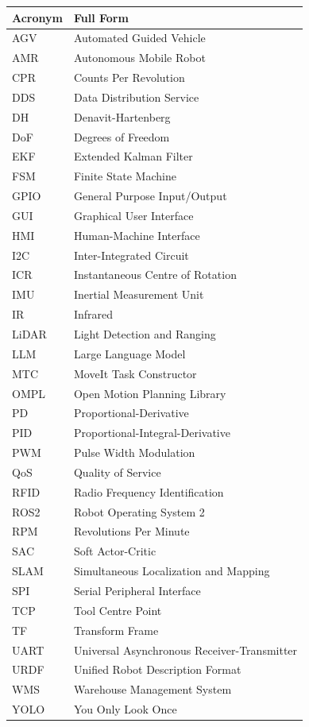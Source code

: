 \documentclass[12pt,a4paper,oneside]{report}
\begin{document}
\begin{longtable}{p{3cm} p{10cm}}
\toprule
\textbf{Acronym} & \textbf{Full Form} \\
\midrule
AGV & Automated Guided Vehicle \\
AMR & Autonomous Mobile Robot \\
CPR & Counts Per Revolution \\
DDS & Data Distribution Service \\
DH & Denavit-Hartenberg \\
DoF & Degrees of Freedom \\
EKF & Extended Kalman Filter \\
FSM & Finite State Machine \\
GPIO & General Purpose Input/Output \\
GUI & Graphical User Interface \\
HMI & Human-Machine Interface \\
I2C & Inter-Integrated Circuit \\
ICR & Instantaneous Centre of Rotation \\
IMU & Inertial Measurement Unit \\
IR & Infrared \\
LiDAR & Light Detection and Ranging \\
LLM & Large Language Model \\
MTC & MoveIt Task Constructor \\
OMPL & Open Motion Planning Library \\
PD & Proportional-Derivative \\
PID & Proportional-Integral-Derivative \\
PWM & Pulse Width Modulation \\
QoS & Quality of Service \\
RFID & Radio Frequency Identification \\
ROS2 & Robot Operating System 2 \\
RPM & Revolutions Per Minute \\
SAC & Soft Actor-Critic \\
SLAM & Simultaneous Localization and Mapping \\
SPI & Serial Peripheral Interface \\
TCP & Tool Centre Point \\
TF & Transform Frame \\
UART & Universal Asynchronous Receiver-Transmitter \\
URDF & Unified Robot Description Format \\
WMS & Warehouse Management System \\
YOLO & You Only Look Once \\
\bottomrule
\end{longtable}
\end{document}
